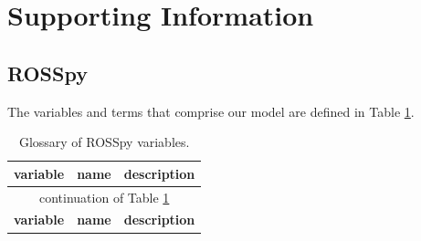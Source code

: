 



\section{Supporting Information}

\begin{supplementary}

\subsection{ROSSpy}

The variables and terms that comprise our model are defined in Table \ref{glossary}.

\begin{longtable}{c|c|c}
    \caption{
        Glossary of ROSSpy variables.  
        \label{glossary} 
    } \\ \toprule
    
    \textbf{variable} & \textbf{name} & \textbf{description} \\ \toprule
    \endfirsthead
    \multicolumn{3}{c}{continuation of Table \ref{glossary}} \\  \toprule
    \textbf{variable} & \textbf{name} & \textbf{description} \\ \toprule
    \endhead
    

\end{longtable}
\end{supplementary}
